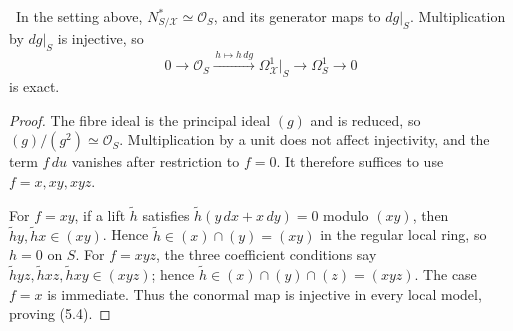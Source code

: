 \begin{lemma}\label{lem:conormal-injective}
\Verified\ In the setting above, $N^*_{S/\mathcal X}\simeq\mathcal O_S$,
and its generator maps to $dg|_S$.  Multiplication by $dg|_S$ is injective,
so
\[
0\longrightarrow\mathcal O_S
\xrightarrow{\,h\mapsto h\,dg\,}
\Omega^1_{\mathcal X}|_S\longrightarrow\Omega^1_S\longrightarrow0
\tag{5.4}
\]
is exact.
\end{lemma}

\begin{proof}
The fibre ideal is the principal ideal $(g)$ and is reduced, so
$(g)/(g^2)\simeq\mathcal O_S$.  Multiplication by a unit does not affect
injectivity, and the term $f\,du$ vanishes after restriction to $f=0$.
It therefore suffices to use $f=x,xy,xyz$.

For $f=xy$, if a lift $\widetilde h$ satisfies
$\widetilde h(y\,dx+x\,dy)=0$ modulo $(xy)$, then
$\widetilde h y,\widetilde h x\in(xy)$.  Hence
$\widetilde h\in(x)\cap(y)=(xy)$ in the regular local ring, so $h=0$ on
$S$.  For $f=xyz$, the three coefficient conditions say
$\widetilde h yz,\widetilde h xz,\widetilde h xy\in(xyz)$; hence
$\widetilde h\in(x)\cap(y)\cap(z)=(xyz)$.  The case $f=x$ is immediate.
Thus the conormal map is injective in every local model, proving (5.4).
\end{proof}

